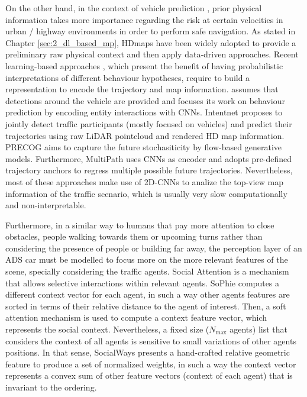 On the other hand, in the context of vehicle prediction \cite{chang2019argoverse, caesar2020nuscenes}, prior physical information takes more importance regarding the risk at certain velocities in urban / highway environments in order to perform safe navigation. As stated in Chapter \ref{sec:2_dl_based_mp}, \acp{HDmap} have been widely adopted to provide a preliminary raw physical context and then apply data-driven approaches. Recent learning-based approaches \cite{hong2019rules, casas2018intentnet}, which present the benefit of having probabilistic interpretations of different behaviour hypotheses, require to build a representation to encode the trajectory and map information. \cite{hong2019rules} assumes that detections around the vehicle are provided and focuses its work on behaviour prediction by encoding entity interactions with \acp{CNN}. Intentnet \cite{casas2018intentnet} proposes to jointly detect traffic participants (mostly focused on vehicles) and predict their trajectories using raw LiDAR pointcloud and rendered HD map information. PRECOG \cite{rhinehart2019precog} aims to capture the future stochasiticity by flow-based generative models. Furthermore, MultiPath \cite{chai2019multipath} uses \acp{CNN} as encoder and adopts pre-defined trajectory anchors to regress multiple possible future trajectories. Nevertheless, most of these approaches make use of 2D-\acp{CNN} to analize the top-view map information of the traffic scenario, which is usually very slow computationally and non-interpretable.

Furthermore, in a similar way to humans that pay more attention to close obstacles, people walking towards them or upcoming turns rather than considering the presence of people or building far away, the perception layer of an \ac{ADS} car must be modelled to focus more on the more relevant features of the scene, specially considering the traffic agents. Social Attention is a mechanism that allows selective interactions within relevant agents. SoPhie \cite{sadeghian2019sophie} computes a different context vector for each agent, in such a way other agents features are sorted in terms of their relative distance to the agent of interest. Then, a soft attention mechanism is used to compute a context feature vector, which represents the social context. Nevertheless, a fixed size ($N_{\text{max}}$ agents) list that considers the context of all agents is sensitive to small variations \cite{mercat2020multi} of other agents positions. In that sense, SocialWays \cite{amirian2019social} presents a hand-crafted relative geometric feature to produce a set of normalized weights, in such a way the context vector represents a convex sum of other feature vectors (context of each agent) that is invariant to the ordering. 


